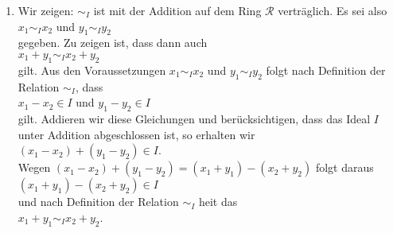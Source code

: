 \begin{enumerate}
      \\[0.2cm]
      \hspace*{1.3cm}
      $x - y \in I$ \quad und \quad $y - z \in I$.
      \\[0.2cm]
      Da Ideale unter Addition abgeschlossen sind, folgt daraus
      \\[0.2cm]
      \hspace*{1.3cm}
      $x - z = (x - y) + (y - z) \in I$.
      \\[0.2cm]
      Nach Definition der Relation $\sim_I$ hei\3t das 
      \\[0.2cm]
      \hspace*{1.3cm}
      $x \sim_I z$.  
      {\color{green}{\checkmark}}
\item Wir zeigen: $\sim_I$ ist mit der Addition auf dem Ring $\mathcal{R}$ vertr\"{a}glich.  Es sei
      also
      \\[0.2cm]
      \hspace*{1.3cm}
      $x_1 \sim_I x_2$ \quad und \quad $y_1 \sim_I y_2$ 
      \\[0.2cm]
      gegeben.  Zu zeigen ist, dass dann auch
      \\[0.2cm]
      \hspace*{1.3cm}
      $x_1 + y_1 \sim_I x_2 + y_2$
      \\[0.2cm]
      gilt.  Aus den Voraussetzungen $x_1 \sim_I x_2$  und $y_1 \sim_I y_2$ folgt nach Definition
      der Relation $\sim_I$, dass
      \\[0.2cm]
      \hspace*{1.3cm}
      $x_1 - x_2 \in I$ \quad und \quad $y_1 - y_2 \in I$ 
      \\[0.2cm]
      gilt.  Addieren wir diese Gleichungen und ber\"{u}cksichtigen, dass das Ideal $I$ unter Addition
      abgeschlossen ist, so erhalten wir
      \\[0.2cm]
      \hspace*{1.3cm}
      $(x_1 - x_2) + (y_1 - y_2) \in I$.
      \\[0.2cm]
      Wegen $(x_1 - x_2) + (y_1 - y_2) = (x_1 + y_1) - (x_2 + y_2)$ folgt daraus
      \\[0.2cm]
      \hspace*{1.3cm}
      $(x_1 + y_1) - (x_2 + y_2) \in I$
      \\[0.2cm]
      und nach Definition der Relation $\sim_I$ hei\3t das
      \\[0.2cm]
      \hspace*{1.3cm}
      $x_1 + y_1 \sim_I x_2 + y_2$. {\color{green}{\checkmark}}

\end{enumerate}
